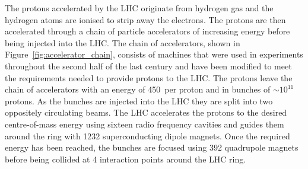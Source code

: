 The protons accelerated by the LHC originate from hydrogen gas and %
the hydrogen atoms are ionised to strip away the electrons. The protons are then accelerated through a chain of particle accelerators of increasing energy before being injected into the LHC. The chain of accelerators, shown in Figure~\ref{fig:accelerator_chain}, consists of machines that were used in experiments throughout the second half of the last century and have been modified to meet the requirements needed to provide protons to the LHC. The protons leave the chain of accelerators with an energy of 450~\gev per proton and in bunches of $\sim 10^{11}$ protons. As the bunches are injected into the LHC they are split into two oppositely circulating beams.
The LHC accelerates the protons to the desired centre-of-mass energy using sixteen radio frequency cavities and guides them around the ring with 1232 superconducting dipole magnets. %
Once the required energy has been reached, the bunches are focused using 392 quadrupole magnets before being collided at 4 interaction points around the LHC ring.%

